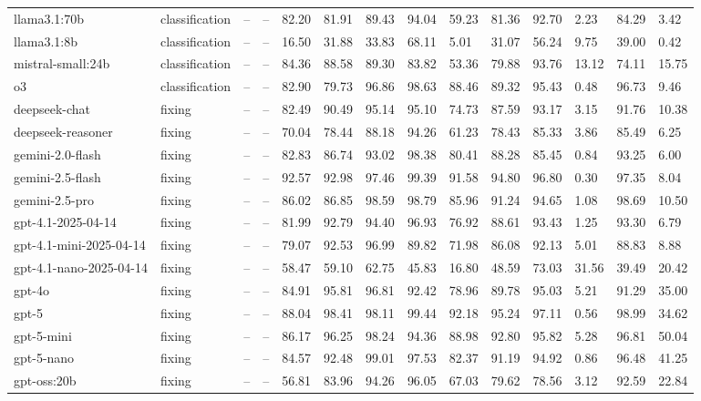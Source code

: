 \begin{table}[!t]
\begin{tabular}{llllllllllllll}
llama3.1:70b & classification & -- & -- & 82.20 & 81.91 & 89.43 & 94.04 & 59.23 & 81.36 & 92.70 & 2.23 & 84.29 & 3.42 \\
llama3.1:8b & classification & -- & -- & 16.50 & 31.88 & 33.83 & 68.11 & 5.01 & 31.07 & 56.24 & 9.75 & 39.00 & 0.42 \\
mistral-small:24b & classification & -- & -- & 84.36 & 88.58 & 89.30 & 83.82 & 53.36 & 79.88 & 93.76 & 13.12 & 74.11 & 15.75 \\
o3 & classification & -- & -- & 82.90 & 79.73 & 96.86 & 98.63 & 88.46 & 89.32 & 95.43 & 0.48 & 96.73 & 9.46 \\
deepseek-chat & fixing & -- & -- & 82.49 & 90.49 & 95.14 & 95.10 & 74.73 & 87.59 & 93.17 & 3.15 & 91.76 & 10.38 \\
deepseek-reasoner & fixing & -- & -- & 70.04 & 78.44 & 88.18 & 94.26 & 61.23 & 78.43 & 85.33 & 3.86 & 85.49 & 6.25 \\
gemini-2.0-flash & fixing & -- & -- & 82.83 & 86.74 & 93.02 & 98.38 & 80.41 & 88.28 & 85.45 & 0.84 & 93.25 & 6.00 \\
gemini-2.5-flash & fixing & -- & -- & 92.57 & 92.98 & 97.46 & 99.39 & 91.58 & 94.80 & 96.80 & 0.30 & 97.35 & 8.04 \\
gemini-2.5-pro & fixing & -- & -- & 86.02 & 86.85 & 98.59 & 98.79 & 85.96 & 91.24 & 94.65 & 1.08 & 98.69 & 10.50 \\
gpt-4.1-2025-04-14 & fixing & -- & -- & 81.99 & 92.79 & 94.40 & 96.93 & 76.92 & 88.61 & 93.43 & 1.25 & 93.30 & 6.79 \\
gpt-4.1-mini-2025-04-14 & fixing & -- & -- & 79.07 & 92.53 & 96.99 & 89.82 & 71.98 & 86.08 & 92.13 & 5.01 & 88.83 & 8.88 \\
gpt-4.1-nano-2025-04-14 & fixing & -- & -- & 58.47 & 59.10 & 62.75 & 45.83 & 16.80 & 48.59 & 73.03 & 31.56 & 39.49 & 20.42 \\
gpt-4o & fixing & -- & -- & 84.91 & 95.81 & 96.81 & 92.42 & 78.96 & 89.78 & 95.03 & 5.21 & 91.29 & 35.00 \\
gpt-5 & fixing & -- & -- & 88.04 & 98.41 & 98.11 & 99.44 & 92.18 & 95.24 & 97.11 & 0.56 & 98.99 & 34.62 \\
gpt-5-mini & fixing & -- & -- & 86.17 & 96.25 & 98.24 & 94.36 & 88.98 & 92.80 & 95.82 & 5.28 & 96.81 & 50.04 \\
gpt-5-nano & fixing & -- & -- & 84.57 & 92.48 & 99.01 & 97.53 & 82.37 & 91.19 & 94.92 & 0.86 & 96.48 & 41.25 \\
gpt-oss:20b & fixing & -- & -- & 56.81 & 83.96 & 94.26 & 96.05 & 67.03 & 79.62 & 78.56 & 3.12 & 92.59 & 22.84 \\

\end{tabular}
\end{table}
